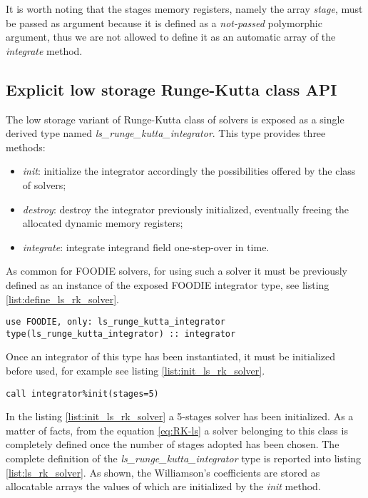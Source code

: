 It is worth noting that the stages memory registers, namely the array \emph{stage}, must be passed as argument because it is defined as a \emph{not-passed} polymorphic argument, thus we are not allowed to define it as an automatic array of the \emph{integrate} method.

\subsection{Explicit low storage Runge-Kutta class API}\label{subsec:solver_ls_rk}

The low storage variant of Runge-Kutta class of solvers is exposed as a single derived type named \emph{ls\_runge\_kutta\_integrator}. This type provides three methods:

\begin{itemize}
  \item \emph{init}: initialize the integrator accordingly the possibilities offered by the class of solvers;
  \item \emph{destroy}: destroy the integrator previously initialized, eventually freeing the allocated dynamic memory registers;
  \item \emph{integrate}: integrate integrand field one-step-over in time.
  \end{itemize}

As common for FOODIE solvers, for using such a solver it must be previously defined as an instance of the exposed FOODIE integrator type, see listing \ref{list:define_ls_rk_solver}.

\begin{lstlisting}[firstnumber=1,style=code,caption={definition of an explicit low storage Runge-Kutta integrator},label={list:define_ls_rk_solver}]
use FOODIE, only: ls_runge_kutta_integrator
type(ls_runge_kutta_integrator) :: integrator
\end{lstlisting}

Once an integrator of this type has been instantiated, it must be initialized before used, for example see listing \ref{list:init_ls_rk_solver}.

\begin{lstlisting}[firstnumber=1,style=code,caption={example of initialization of an explicit low storage Runge-Kutta integrator},label={list:init_ls_rk_solver}]
call integrator%init(stages=5)
\end{lstlisting}

In the listing \ref{list:init_ls_rk_solver} a 5-stages solver has been initialized. As a matter of facts, from the equation \ref{eq:RK-ls} a solver belonging to this class is completely defined once the number of stages adopted has been chosen. The complete definition of the \emph{ls\_runge\_kutta\_integrator} type is reported into listing \ref{list:ls_rk_solver}. As shown, the Williamson's coefficients are stored as allocatable arrays the values of which are initialized by the \emph{init} method.

